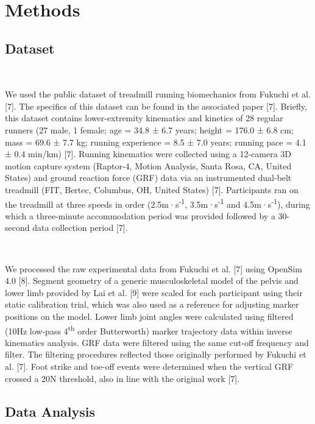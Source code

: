 \documentclass[]{elsarticle} %
\begin{document}
\hypertarget{methods}{%
\section{Methods}\label{methods}}

\hypertarget{dataset}{%
\subsection{Dataset}\label{dataset}}

~

We used the public dataset of treadmill running biomechanics from
Fukuchi et al. {[}7{]}. The specifics of this dataset can be found in
the associated paper {[}7{]}. Briefly, this dataset contains
lower-extremity kinematics and kinetics of 28 regular runners (27 male,
1 female; age = 34.8 ± 6.7 years; height = 176.0 ± 6.8 cm; mass = 69.6 ±
7.7 kg; running experience = 8.5 ± 7.0 years; running pace = 4.1 ± 0.4
min/km) {[}7{]}. Running kinematics were collected using a 12-camera 3D
motion capture system (Raptor-4, Motion Analysis, Santa Rosa, CA, United
States) and ground reaction force (GRF) data via an instrumented
dual-belt treadmill (FIT, Bertec, Columbus, OH, United States) {[}7{]}.
Participants ran on the treadmill at three speeds in order
(2.5m·s\textsuperscript{-1}, 3.5m·s\textsuperscript{-1} and
4.5m·s\textsuperscript{-1}), during which a three-minute accommodation
period was provided followed by a 30-second data collection period
{[}7{]}.

~

We processed the raw experimental data from Fukuchi et al. {[}7{]} using
OpenSim 4.0 {[}8{]}. Segment geometry of a generic musculoskeletal model
of the pelvis and lower limb provided by Lai et al. {[}9{]} were scaled
for each participant using their static calibration trial, which was
also used as a reference for adjusting marker positions on the model.
Lower limb joint angles were calculated using filtered (10Hz low-pass
4\textsuperscript{th} order Butterworth) marker trajectory data within
inverse kinematics analysis. GRF data were filtered using the same
cut-off frequency and filter. The filtering procedures reflected those
originally performed by Fukuchi et al. {[}7{]}. Foot strike and toe-off
events were determined when the vertical GRF crossed a 20N threshold,
also in line with the original work {[}7{]}.

\hypertarget{data-analysis}{%
\subsection{Data Analysis}\label{data-analysis}}
\end{document}

